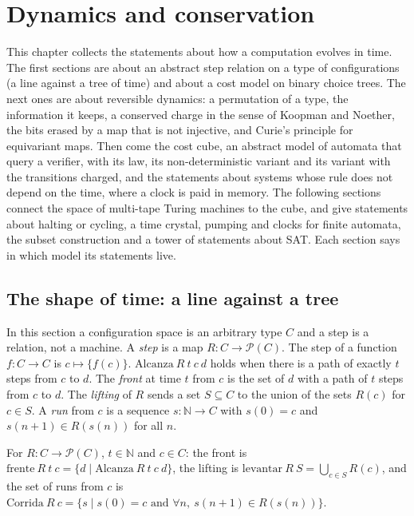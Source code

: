 \chapter{Dynamics and conservation}
\label{chap:dynamics}

This chapter collects the statements about how a computation evolves in time. The first sections
are about an abstract step relation on a type of configurations (a line against a tree of time) and
about a cost model on binary choice trees. The next ones are about reversible dynamics: a
permutation of a type, the information it keeps, a conserved charge in the sense of Koopman and
Noether, the bits erased by a map that is not injective, and Curie's principle for equivariant
maps. Then come the cost cube, an abstract model of automata that query a verifier, with its law,
its non-deterministic variant and its variant with the transitions charged, and the statements about
systems whose rule does not depend on the time, where a clock is paid in memory. The following
sections connect the space of multi-tape Turing machines to the cube, and give statements about
halting or cycling, a time crystal, pumping and clocks for finite automata, the subset construction
and a tower of statements about SAT. Each section says in which model its statements live.

\section{The shape of time: a line against a tree}
\label{sec:dynamics-shape}

In this section a configuration space is an arbitrary type $C$ and a step is a relation, not a
machine. A \emph{step} is a map $R : C \to \mathcal{P}(C)$. The step of a function $f : C \to C$
is $c \mapsto \{f(c)\}$. $\mathrm{Alcanza}\ R\ t\ c\ d$ holds when there is a path of exactly $t$
steps from $c$ to $d$. The \emph{front} at time $t$ from $c$ is the set of $d$ with a path of $t$
steps from $c$ to $d$. The \emph{lifting} of $R$ sends a set $S \subseteq C$ to the union of the
sets $R(c)$ for $c \in S$. A \emph{run} from $c$ is a sequence $s : \mathbb{N} \to C$ with
$s(0) = c$ and $s(n+1) \in R(s(n))$ for all $n$.

\begin{definition}
  \label{def:dynamics-front}
  \leanok
  For $R : C \to \mathcal{P}(C)$, $t \in \mathbb{N}$ and $c \in C$: the front is
  $\mathrm{frente}\ R\ t\ c = \{d \mid \mathrm{Alcanza}\ R\ t\ c\ d\}$, the lifting is
  $\mathrm{levantar}\ R\ S = \bigcup_{c \in S} R(c)$, and the set of runs from $c$ is
  $\mathrm{Corrida}\ R\ c = \{s \mid s(0) = c \text{ and } \forall n,\ s(n+1) \in R(s(n))\}$.
  \own{}
\end{definition}

